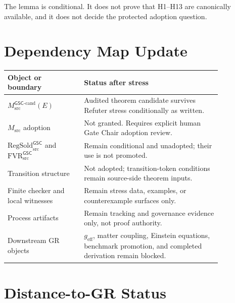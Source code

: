 \documentclass[11pt]{article}
\newcommand{\Msrc}{M_{\mathrm{src}}}
\newcommand{\Mgsccand}{M_{\mathrm{src}}^{\mathsf{GSC}\mbox{-}\mathrm{cand}}}
\newcommand{\RegSold}{\mathrm{RegSold}_{\mathrm{src}}^{\mathsf{GSC}}}
\newcommand{\FVR}{\mathrm{FVR}_{\mathrm{src}}^{\mathsf{GSC}}}
\begin{document}
The lemma is conditional. It does not prove that H1--H13 are canonically
available, and it does not decide the protected adoption question.

\section{Dependency Map Update}

\begin{longtable}{p{0.30\linewidth}p{0.54\linewidth}}
\toprule
Object or boundary & Status after stress \\
\midrule
\(\Mgsccand(E)\) &
Audited theorem candidate survives Refuter stress conditionally as written. \\
\(\Msrc\) adoption &
Not granted. Requires explicit human Gate Chair adoption review. \\
\(\RegSold\) and \(\FVR\) &
Remain conditional and unadopted; their use is not promoted. \\
Transition structure &
Not adopted; transition-token conditions remain source-side theorem inputs. \\
Finite checker and local witnesses &
Remain stress data, examples, or counterexample surfaces only. \\
Process artifacts &
Remain tracking and governance evidence only, not proof authority. \\
Downstream GR objects &
\(g_{\mathrm{eff}}\), matter coupling, Einstein equations, benchmark
promotion, and completed derivation remain blocked. \\
\bottomrule
\end{longtable}

\section{Distance-to-GR Status}
\end{document}
